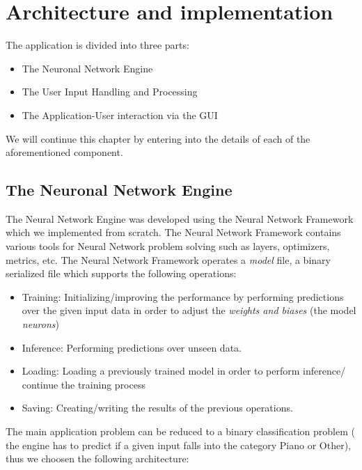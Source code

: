 \chapter{Architecture and implementation}

The application is divided into three parts:
	\begin{itemize}
		\addtolength{\itemindent}{1cm}
		\item The Neuronal Network Engine
		\item The User Input Handling and Processing
		\item The Application-User interaction via the GUI
	\end{itemize}

We will continue this chapter by entering into the details of each of the aforementioned component.

\section{The Neuronal Network Engine}

The Neural Network Engine was developed using the Neural Network Framework which we implemented from scratch. The
Neural Network Framework contains various tools for Neural Network problem solving such as layers, optimizers, metrics,
etc. The Neural Network Framework operates a \textit{model} file, a binary serialized file which supports the following
operations:
	\begin{itemize}
		\item Training: Initializing/improving the performance by performing predictions over the given input
			data in order to adjust the \textit{weights and biases} (the model \textit{neurons})
		\item Inference: Performing predictions over unseen data.
		\item Loading: Loading a previously trained model in order to perform inference/ continue the training process
		\item Saving: Creating/writing the results of the previous operations.

	\end{itemize}
The main application problem can be reduced to a binary classification problem ( the engine has to predict if a given
input falls into the category Piano or Other), thus we choosen the following architecture:


